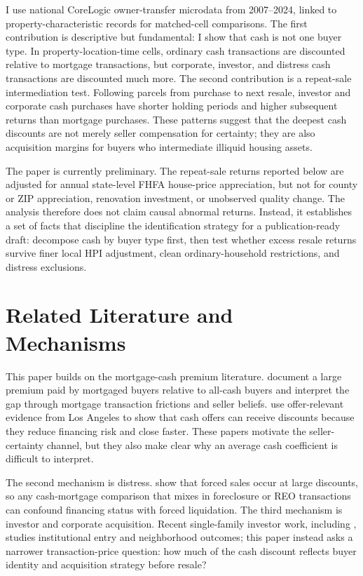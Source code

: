 \documentclass[12pt, letterpaper]{article}
\begin{document}
I use national CoreLogic owner-transfer microdata from 2007--2024, linked to property-characteristic records for matched-cell comparisons. The first contribution is descriptive but fundamental: I show that cash is not one buyer type. In property-location-time cells, ordinary cash transactions are discounted relative to mortgage transactions, but corporate, investor, and distress cash transactions are discounted much more. The second contribution is a repeat-sale intermediation test. Following parcels from purchase to next resale, investor and corporate cash purchases have shorter holding periods and higher subsequent returns than mortgage purchases. These patterns suggest that the deepest cash discounts are not merely seller compensation for certainty; they are also acquisition margins for buyers who intermediate illiquid housing assets.

The paper is currently preliminary. The repeat-sale returns reported below are adjusted for annual state-level FHFA house-price appreciation, but not for county or ZIP appreciation, renovation investment, or unobserved quality change. The analysis therefore does not claim causal abnormal returns. Instead, it establishes a set of facts that discipline the identification strategy for a publication-ready draft: decompose cash by buyer type first, then test whether excess resale returns survive finer local HPI adjustment, clean ordinary-household restrictions, and distress exclusions.

\section{Related Literature and Mechanisms}\label{sec:literature}

This paper builds on the mortgage-cash premium literature. \citet{reher2024mortgagecash} document a large premium paid by mortgaged buyers relative to all-cash buyers and interpret the gap through mortgage transaction frictions and seller beliefs. \citet{han2024cashking} use offer-relevant evidence from Los Angeles to show that cash offers can receive discounts because they reduce financing risk and close faster. These papers motivate the seller-certainty channel, but they also make clear why an average cash coefficient is difficult to interpret.

The second mechanism is distress. \citet{campbell2011forcedsales} show that forced sales occur at large discounts, so any cash-mortgage comparison that mixes in foreclosure or REO transactions can confound financing status with forced liquidation. The third mechanism is investor and corporate acquisition. Recent single-family investor work, including \citet{leewylie2024investors}, studies institutional entry and neighborhood outcomes; this paper instead asks a narrower transaction-price question: how much of the cash discount reflects buyer identity and acquisition strategy before resale?
\end{document}

